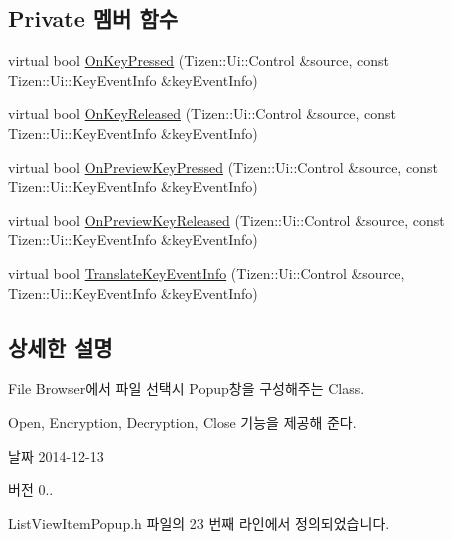 \subsection*{Private 멤버 함수}
\begin{DoxyCompactItemize}
\item 
virtual bool \hyperlink{class_popup_event_listener_ad26fa7e35c0fdd52ad6a6bdd4d3e3901}{On\+Key\+Pressed} (Tizen\+::\+Ui\+::\+Control \&source, const Tizen\+::\+Ui\+::\+Key\+Event\+Info \&key\+Event\+Info)
\item 
virtual bool \hyperlink{class_popup_event_listener_aeadbfbf16cf4be6ac6655ef94fc1cd50}{On\+Key\+Released} (Tizen\+::\+Ui\+::\+Control \&source, const Tizen\+::\+Ui\+::\+Key\+Event\+Info \&key\+Event\+Info)
\item 
virtual bool \hyperlink{class_popup_event_listener_a6ab53e0c9d7ab3a17c25b1bd820a4f13}{On\+Preview\+Key\+Pressed} (Tizen\+::\+Ui\+::\+Control \&source, const Tizen\+::\+Ui\+::\+Key\+Event\+Info \&key\+Event\+Info)
\item 
virtual bool \hyperlink{class_popup_event_listener_af38f07d911d13001455e8ac4bab4cd3e}{On\+Preview\+Key\+Released} (Tizen\+::\+Ui\+::\+Control \&source, const Tizen\+::\+Ui\+::\+Key\+Event\+Info \&key\+Event\+Info)
\item 
virtual bool \hyperlink{class_popup_event_listener_a2cce7fb106a3b8a4ab66a26284d64a83}{Translate\+Key\+Event\+Info} (Tizen\+::\+Ui\+::\+Control \&source, Tizen\+::\+Ui\+::\+Key\+Event\+Info \&key\+Event\+Info)
\end{DoxyCompactItemize}


\subsection{상세한 설명}
File Browser에서 파일 선택시 Popup창을 구성해주는 Class. 

Open, Encryption, Decryption, Close 기능을 제공해 준다. \begin{DoxyDate}{날짜}
2014-\/12-\/13 
\end{DoxyDate}
\begin{DoxyVersion}{버전}
0.. 
\end{DoxyVersion}


List\+View\+Item\+Popup.\+h 파일의 23 번째 라인에서 정의되었습니다.



